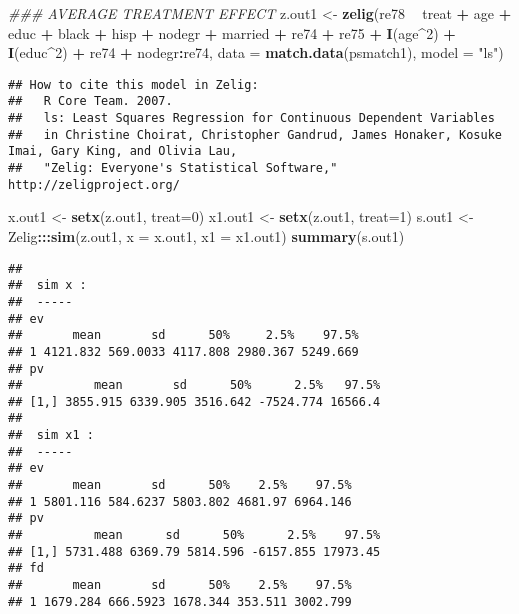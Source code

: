 \documentclass[]{article}
\newenvironment{Shaded}{\begin{snugshade}}{\end{snugshade}}
\newcommand{\CommentTok}[1]{\textcolor[rgb]{0.56,0.35,0.01}{\textit{#1}}}
\newcommand{\DataTypeTok}[1]{\textcolor[rgb]{0.13,0.29,0.53}{#1}}
\newcommand{\DecValTok}[1]{\textcolor[rgb]{0.00,0.00,0.81}{#1}}
\newcommand{\KeywordTok}[1]{\textcolor[rgb]{0.13,0.29,0.53}{\textbf{#1}}}
\newcommand{\NormalTok}[1]{#1}
\newcommand{\OperatorTok}[1]{\textcolor[rgb]{0.81,0.36,0.00}{\textbf{#1}}}
\newcommand{\StringTok}[1]{\textcolor[rgb]{0.31,0.60,0.02}{#1}}
\begin{document}
\begin{Shaded}
\begin{Highlighting}[]
\CommentTok{### AVERAGE TREATMENT EFFECT }
\NormalTok{z.out1 <-}\StringTok{ }\KeywordTok{zelig}\NormalTok{(re78 }\OperatorTok{~}\StringTok{ }\NormalTok{treat }\OperatorTok{+}\StringTok{ }\NormalTok{age }\OperatorTok{+}\StringTok{ }\NormalTok{educ }\OperatorTok{+}\StringTok{ }\NormalTok{black }\OperatorTok{+}\StringTok{ }\NormalTok{hisp }\OperatorTok{+}\StringTok{ }\NormalTok{nodegr }\OperatorTok{+}\StringTok{ }\NormalTok{married }\OperatorTok{+}\StringTok{ }\NormalTok{re74 }\OperatorTok{+}\StringTok{ }\NormalTok{re75 }\OperatorTok{+}\StringTok{ }
\StringTok{                 }\KeywordTok{I}\NormalTok{(age}\OperatorTok{^}\DecValTok{2}\NormalTok{) }\OperatorTok{+}\StringTok{ }\KeywordTok{I}\NormalTok{(educ}\OperatorTok{^}\DecValTok{2}\NormalTok{) }\OperatorTok{+}\StringTok{ }\NormalTok{re74 }\OperatorTok{+}\StringTok{ }\NormalTok{nodegr}\OperatorTok{:}\NormalTok{re74, }\DataTypeTok{data =} \KeywordTok{match.data}\NormalTok{(psmatch1), }\DataTypeTok{model =} \StringTok{"ls"}\NormalTok{)}
\end{Highlighting}
\end{Shaded}

\begin{verbatim}
## How to cite this model in Zelig:
##   R Core Team. 2007.
##   ls: Least Squares Regression for Continuous Dependent Variables
##   in Christine Choirat, Christopher Gandrud, James Honaker, Kosuke Imai, Gary King, and Olivia Lau,
##   "Zelig: Everyone's Statistical Software," http://zeligproject.org/
\end{verbatim}

\begin{Shaded}
\begin{Highlighting}[]
\NormalTok{x.out1 <-}\StringTok{ }\KeywordTok{setx}\NormalTok{(z.out1, }\DataTypeTok{treat=}\DecValTok{0}\NormalTok{)}
\NormalTok{x1.out1 <-}\StringTok{ }\KeywordTok{setx}\NormalTok{(z.out1, }\DataTypeTok{treat=}\DecValTok{1}\NormalTok{)}
\NormalTok{s.out1 <-}\StringTok{ }\NormalTok{Zelig}\OperatorTok{:::}\KeywordTok{sim}\NormalTok{(z.out1, }\DataTypeTok{x =}\NormalTok{ x.out1, }\DataTypeTok{x1 =}\NormalTok{ x1.out1)}
\KeywordTok{summary}\NormalTok{(s.out1)}
\end{Highlighting}
\end{Shaded}

\begin{verbatim}
## 
##  sim x :
##  -----
## ev
##       mean       sd      50%     2.5%    97.5%
## 1 4121.832 569.0033 4117.808 2980.367 5249.669
## pv
##          mean       sd      50%      2.5%   97.5%
## [1,] 3855.915 6339.905 3516.642 -7524.774 16566.4
## 
##  sim x1 :
##  -----
## ev
##       mean       sd      50%    2.5%    97.5%
## 1 5801.116 584.6237 5803.802 4681.97 6964.146
## pv
##          mean      sd      50%      2.5%    97.5%
## [1,] 5731.488 6369.79 5814.596 -6157.855 17973.45
## fd
##       mean       sd      50%    2.5%    97.5%
## 1 1679.284 666.5923 1678.344 353.511 3002.799
\end{verbatim}
\end{document}
